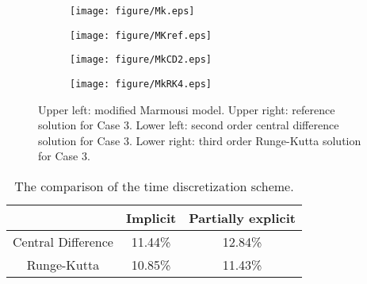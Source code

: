 \documentclass[preprint,12pt]{elsarticle}
\begin{document}
\begin{figure}[H]
    \centering
    \begin{subfigure}[b]{0.38\textwidth}
        \texttt{[image: figure/Mk.eps]}
        \caption{}
        \label{fig:image133}
    \end{subfigure}
    \begin{subfigure}[b]{0.38\textwidth}
        \texttt{[image: figure/MKref.eps]}
        \caption{}
        \label{fig:image2333}
    \end{subfigure}
    \begin{subfigure}[b]{0.38\textwidth}
        \texttt{[image: figure/MkCD2.eps]}
        \caption{}
        \label{fig:image333}
    \end{subfigure}
     \begin{subfigure}[b]{0.38\textwidth}
        \texttt{[image: figure/MkRK4.eps]}
        \caption{}
        \label{fig:image335}
    \end{subfigure}
    \caption{Upper left: modified Marmousi model. Upper right: reference solution for Case 3. Lower left: second order central difference solution for Case 3. Lower right: third order Runge-Kutta solution for Case 3.}
    \label{fig:k2}
\end{figure}
\begin{table}[H]
\centering
\begin{tabular}{c|c|c}
~ & Implicit & Partially explicit  \\
\hline
Central Difference& 11.44\% & 12.84\%  \\
\hline
Runge-Kutta & 10.85\% & 11.43\%  \\
\hline
\end{tabular}
\caption{The comparison of the time discretization scheme.}
 \label{tablee}
\end{table}
\end{document}
